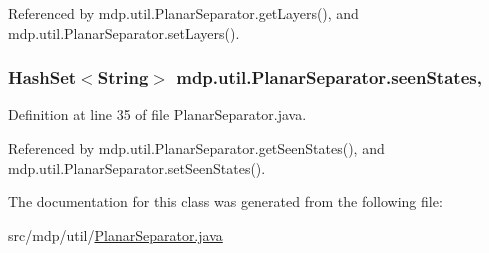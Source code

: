 Referenced by mdp.\+util.\+Planar\+Separator.\+get\+Layers(), and mdp.\+util.\+Planar\+Separator.\+set\+Layers().

\hypertarget{classmdp_1_1util_1_1_planar_separator_a9abf62832f8732e6f6304db702296da9}{}
\subsubsection[{seen\+States}]{\setlength{\rightskip}{0pt plus 5cm}Hash\+Set$<$String$>$ mdp.\+util.\+Planar\+Separator.\+seen\+States\hspace{0.3cm}{\ttfamily [static]}, {\ttfamily [private]}}\label{classmdp_1_1util_1_1_planar_separator_a9abf62832f8732e6f6304db702296da9}


Definition at line 35 of file Planar\+Separator.\+java.



Referenced by mdp.\+util.\+Planar\+Separator.\+get\+Seen\+States(), and mdp.\+util.\+Planar\+Separator.\+set\+Seen\+States().



The documentation for this class was generated from the following file\+:\begin{DoxyCompactItemize}
\item 
src/mdp/util/\hyperlink{_planar_separator_8java}{Planar\+Separator.\+java}\end{DoxyCompactItemize}
